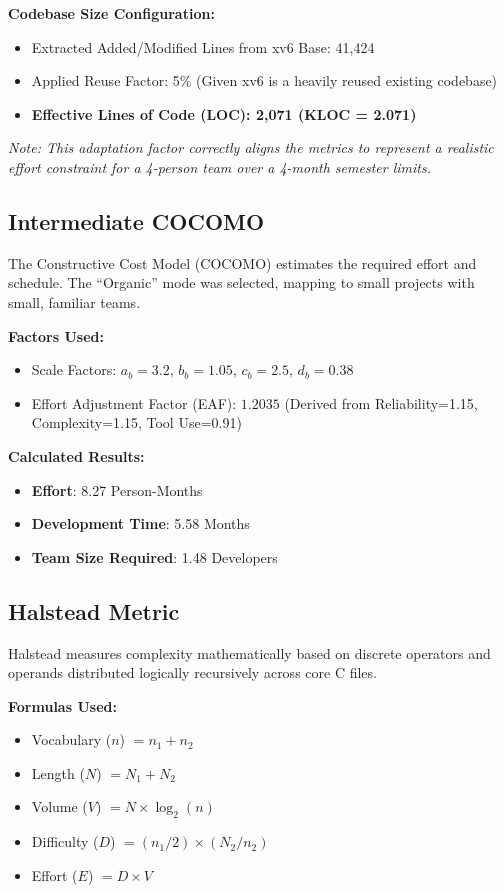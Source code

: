 \documentclass[12pt]{article}
\begin{document}
\textbf{Codebase Size Configuration:}
\begin{itemize}
    \item Extracted Added/Modified Lines from xv6 Base: 41,424
    \item Applied Reuse Factor: 5\% (Given xv6 is a heavily reused existing codebase)
    \item \textbf{Effective Lines of Code (LOC): 2,071 (KLOC = 2.071)}
\end{itemize}
\textit{Note: This adaptation factor correctly aligns the metrics to represent a realistic effort constraint for a 4-person team over a 4-month semester limits.}
\vspace{0.3cm}

\subsection{Intermediate COCOMO}
The Constructive Cost Model (COCOMO) estimates the required effort and schedule. The ``Organic'' mode was selected, mapping to small projects with small, familiar teams.

\textbf{Factors Used:}
\begin{itemize}
    \item Scale Factors: $a_b = 3.2$, $b_b = 1.05$, $c_b = 2.5$, $d_b = 0.38$
    \item Effort Adjustment Factor (EAF): $1.2035$ (Derived from Reliability=1.15, Complexity=1.15, Tool Use=0.91)
\end{itemize}

\textbf{Calculated Results:}
\begin{itemize}
    \item \textbf{Effort}: 8.27 Person-Months
    \item \textbf{Development Time}: 5.58 Months
    \item \textbf{Team Size Required}: 1.48 Developers
\end{itemize}

\subsection{Halstead Metric}
Halstead measures complexity mathematically based on discrete operators and operands distributed logically recursively across core C files.

\textbf{Formulas Used:}
\begin{itemize}
    \item Vocabulary ($n$) $= n_1 + n_2$
    \item Length ($N$) $= N_1 + N_2$
    \item Volume ($V$) $= N \times \log_2(n)$
    \item Difficulty ($D$) $= (n_1/2) \times (N_2/n_2)$
    \item Effort ($E$) $= D \times V$
\end{itemize}
\end{document}
